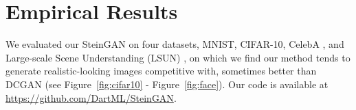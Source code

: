 
\section{Empirical Results}  \label{sec:gan}

We evaluated our SteinGAN on four datasets,  
MNIST, CIFAR-10, CelebA \citep{liu2015faceattributes}, and Large-scale Scene Understanding (LSUN) \citep{yu2015lsun}, on which we find our method tends to generate realistic-looking images competitive with, sometimes better than DCGAN \citep{radford2015unsupervised} (see Figure~\ref{fig:cifar10} - Figure~\ref{fig:face}). 
Our code is available at \url{https://github.com/DartML/SteinGAN}.

\newcommand{\enc}{\mathrm{E}}
\newcommand{\dec}{\mathrm{D}}
